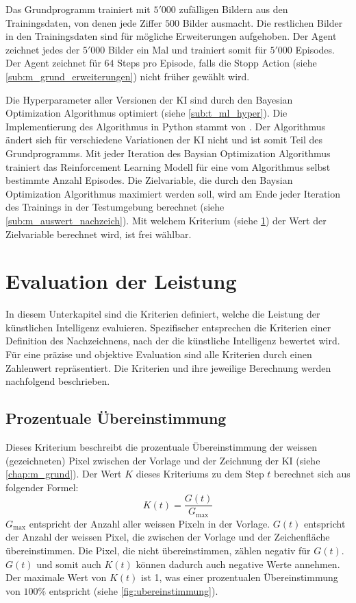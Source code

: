 Das Grundprogramm trainiert mit $5'000$ zufälligen Bildern aus den
Trainingsdaten, von denen jede Ziffer $500$ Bilder ausmacht. Die restlichen
Bilder in den Trainingsdaten sind für mögliche Erweiterungen aufgehoben. Der
Agent zeichnet jedes der $5'000$ Bilder ein Mal und trainiert somit für $5'000$
Episodes. Der Agent zeichnet für $64$ Steps pro Episode, falls die Stopp Action
(siehe \ref{sub:m_grund_erweiterungen}) nicht früher gewählt wird.
 
Die Hyperparameter aller Versionen der KI sind durch den Bayesian Optimization
Algorithmus optimiert (siehe \ref{sub:t_ml_hyper}). Die Implementierung
des Algorithmus in Python stammt von \cite{fernando_nogueira_bayesian_2014}. Der
Algorithmus ändert sich für verschiedene Variationen der KI nicht und ist somit
Teil des Grundprogramms. Mit jeder Iteration des Baysian Optimization
Algorithmus trainiert das Reinforcement Learning Modell für eine vom Algorithmus
selbst bestimmte Anzahl Episodes. Die Zielvariable, die durch den Baysian
Optimization Algorithmus maximiert werden soll, wird am Ende jeder Iteration des
Trainings in der Testumgebung berechnet (siehe \ref{sub:m_auswert_nachzeich}).
Mit welchem Kriterium (siehe \ref{chap:m_eval}) der Wert der
Zielvariable berechnet wird, ist frei wählbar.
 
\section{Evaluation der Leistung}\label{chap:m_eval} In diesem Unterkapitel sind
die Kriterien definiert, welche die Leistung der künstlichen Intelligenz
evaluieren. Spezifischer entsprechen die Kriterien einer Definition des
Nachzeichnens, nach der die künstliche Intelligenz bewertet wird. Für eine
präzise und objektive Evaluation sind alle Kriterien durch einen Zahlenwert
repräsentiert. Die Kriterien und ihre jeweilige Berechnung werden nachfolgend
beschrieben.

\subsection{Prozentuale Übereinstimmung}\label{sub:m_eval_proc}
Dieses Kriterium beschreibt die prozentuale Übereinstimmung der weissen
(gezeichneten) Pixel zwischen der Vorlage und der Zeichnung der KI (siehe
\ref{chap:m_grund}). Der Wert $K$ dieses Kriteriums zu dem Step $t$
berechnet sich aus folgender Formel:
\[ K(t) = \frac{G(t)}{G_{\max}} \] $G_{\max}$ entspricht der Anzahl aller
weissen Pixeln in der Vorlage. $G(t)$ entspricht der Anzahl der weissen Pixel,
die zwischen der Vorlage und der Zeichenfläche übereinstimmen. Die Pixel, die
nicht übereinstimmen, zählen negativ für $G(t)$. $G(t)$ und somit auch $K(t)$
können dadurch auch negative Werte annehmen. Der maximale Wert von $K(t)$ ist 1,
was einer prozentualen Übereinstimmung von $100\%$ entspricht (siehe
\autoref{fig:ubereinstimmung}).
 
